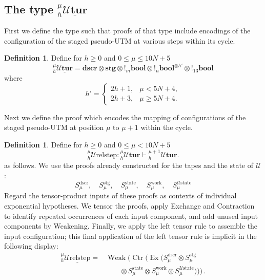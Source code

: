 \documentclass[english,letter paper,12pt,reqno]{article}
\theoremstyle{definition}
\newtheorem{definition}[theorem]{Definition}
\begin{document}
\subsection{The type ${}_h^\mu\underline{\mathcal{U}\textbf{tur}}$}\label{section:tape_type_utm}

First we define the type such that proofs of that type include encodings of the configuration of the staged pseudo-UTM at various steps within its cycle.

\begin{definition} Define for $h \ge 0$ and $0 \le \mu \le 10N + 5$
\begin{equation}
    {}_h^\mu\underline{\mathcal{U}\textbf{tur}} = \textbf{dscr} \otimes \textbf{stg} \otimes {!}{}_m\textbf{bool} \otimes {!}{}_n\textbf{bool}^{\otimes h'}\otimes {!}{}_{13}\textbf{bool}
\end{equation}
where
\begin{equation}
    h' =
    \begin{cases}
        2h+1,& \mu < 5N+4,\\
        2h+3,& \mu \geq 5N+4.
    \end{cases}
\end{equation}
\end{definition}

Next we define the proof which encodes the mapping of configurations of the staged pseudo-UTM at position $\mu$ to $\mu+1$ within the cycle.

\begin{definition} Define for $h \ge 0$ and $0 \le \mu < 10N + 5$
    \begin{equation}
    {}_h^{\mu}\underline{\text{$\mathcal{U}$relstep}}: {}_h^\mu\underline{\mathcal{U}\textbf{tur}} \vdash {}_h^{\mu+1}\underline{\mathcal{U}\textbf{tur}}.
    \end{equation}
    as follows. We use the proofs already constructed for the tapes and the state of $\mathcal{U}$:
    \begin{equation}
        S^{\text{dscr}}_{\mu},\quad S^{\text{stg}}_{\mu},\quad
        S^{\text{state}}_{\mu},\quad
        S^{\text{work}}_{\mu},\quad
        S^{\mathcal{U}\text{state}}_{\mu}
    \end{equation}
    Regard the tensor-product inputs of these proofs as contexts of individual exponential hypotheses. We tensor the proofs, apply Exchange and Contraction to identify repeated occurrences of each input component, and add unused input components by Weakening. Finally, we apply the left tensor rule to assemble the input configuration; this final application of the left tensor rule is implicit in the following display:
    \begin{align*}
    {}_h^{\mu}\underline{\text{$\mathcal{U}$relstep}} = &\operatorname{Weak}\Big(\operatorname{Ctr}\Big(\operatorname{Ex}\Big(S^{\text{dscr}}_{\mu} \otimes S^{\text{stg}}_{\mu}\\
    & \qquad \otimes S^{\text{state}}_{\mu} \otimes S^{\text{work}}_{\mu} \otimes S^{\mathcal{U}\text{state}}_{\mu} \Big)\Big)\Big)\,.
    \end{align*}
\end{definition}
\end{document}
